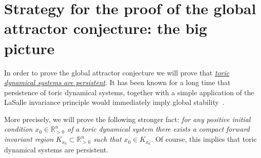 \documentclass[12pt,letterpaper]{article}
\newcommand{\T}{\mathcal{T}}
\newcommand{\RR}{\mathbb{R}}
\newcommand{\RRp}{\mathbb{R}_{>0}}
\begin{document}
\newpage

\section{Strategy for the proof of the global attractor conjecture: the big picture} 
\label{section:strategy}





\bigskip


In order to prove the global attractor conjecture we will prove that \ul{\em toric dynamical systems are persistent}. It has been known for a long time that persistence of toric dynamical systems, together with a simple application of the LaSalle invariance principle would immediately imply global stability~\cite{siegel_maclean, Sontag1, Extinction_in_reaction_networks}. 

More precisely, we will prove the following stronger fact:  {\em for any positive initial condition $x_0 \in \RRp^n$ of a toric dynamical system there exists a compact forward invariant region $K_{x_0} \subset \RRp^n$ such that $x_0 \in K_{x_0}$.} Of course, this  implies that toric dynamical systems are persistent. 
\end{document}
